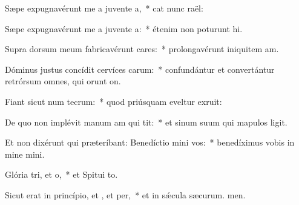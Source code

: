 \item Sæpe expugnavérunt me a juvente a,~* cat nunc raël:
\item Sæpe expugnavérunt me a juvente a:~* étenim non poturunt hi.
\item Supra dorsum meum fabricavérunt cares:~* prolongavérunt iniquitem am.
\item Dóminus justus concídit cervíces carum:~* confundántur et convertántur retrórsum omnes, qui orunt on.
\item Fiant sicut num tecrum:~* quod priúsquam eveltur exruit:
\item De quo non implévit manum am qui tit:~* et sinum suum qui mapulos ligit.
\item Et non dixérunt qui præteríbant: Benedíctio mini  vos:~* benedíximus vobis in mine mini.
\item Glória tri, et o,~* et Spitui to.
\item Sicut erat in princípio, et , et per,~* et in sǽcula sæcurum. men.

